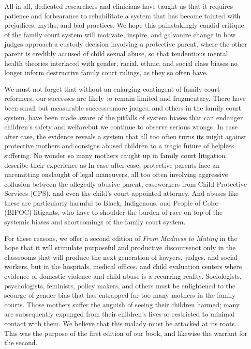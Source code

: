 All in all, dedicated researchers and clinicians have taught us that it requires patience and forbearance to rehabilitate a system that has become
tainted with prejudices, myths, and bad practices. We hope this
painstakingly candid critique of the family court system will motivate,
inspire, and galvanize change in how judges approach a custody decision 
involving a protective parent, where the other parent is credibly accused
of child sexual abuse, so that tendentious mental health theories 
interlaced with gender, racial, ethnic, and social class biases no longer inform
destructive family court rulings, as they so often have. \pfl{}

We must not forget that without an enlarging contingent of family
court reformers, our successes are likely to remain limited and 
fragmentary.  There have been small but measurable successes\mdash{}more 
judges, and others in the family court system, have been made aware of the pitfalls
of system biases that can endanger children's safety and 
welfare\mdash{}but
we continue to observe serious wrongs. In case after case, the evidence
reveals a system that all too often turns its might against protective
mothers and consigns abused children to a tragic future of helpless suffering. 
No wonder so many mothers caught up in family court litigation
describe their experience as  In case after case, protective 
parents face an unremitting onslaught of legal maneuvers, all
too often involving aggressive collusion between the allegedly abusive
parent, caseworkers from Child Protective Services (CPS), and even the
child’s court-appointed attorney. And abuses like these are particularly
harmful to Black, Indigenous, and People of Color (BIPOC) litigants, who
have to shoulder the burden of race on top of the systemic biases and
shortcomings of the family court system. \pfl{}

For these reasons, we offer a second edition of \textit{From Madness to
Mutiny} in the hope that it will stimulate purposeful and productive 
discourse\mdash{}not only in the classrooms that will produce the next generation of lawyers,
judges, and social workers, but in the hospitals, medical offices, 
and child evaluation centers where evidence of domestic violence and child abuse 
is a recurring reality. Sociologists, psychologists, feminists, policy makers,
and others must be enlightened to the scourge of gender bias that has
entrapped far too many mothers in the family courts. Those mothers suffer the anguish of seeing their children harmed; many are subsequently
expunged from their children's lives or restricted to minimal contact
with them. We believe that this malady
must be attacked at its roots. This was the purpose of the first edition of
our book, and likewise the warrant for the second. \pfl{}


